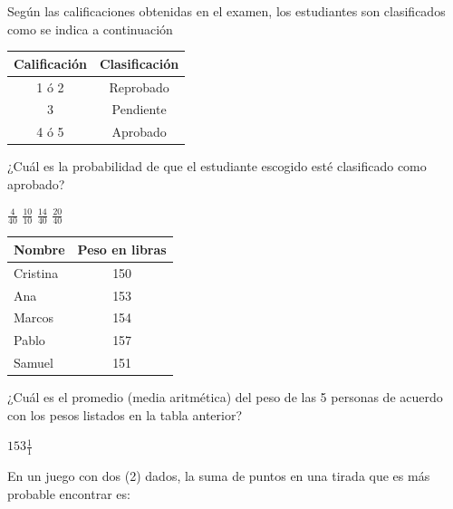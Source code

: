 \documentclass[10pt,letterpaper,addpoints]{exam}
\begin{document}
\begin{multicols}{2}
\begin{questions}
\question \label{quest02} Según las calificaciones obtenidas en el examen, los estudiantes son clasificados como se indica a continuación
\begin{center}
\begin{tabular}{|c|c|}
\hline 
\textbf{Calificación} & Clasificación \\ 
\hline 
1 ó 2 & Reprobado \\ 
\hline 
3 & Pendiente \\ 
\hline 
4 ó 5 & Aprobado \\ 
\hline 
\end{tabular} 
\end{center}
¿Cuál es la probabilidad de que el estudiante escogido esté clasificado como aprobado?

\begin{oneparchoices}
\choice $\frac{4}{40}$ \choice $\frac{10}{10}$
\CorrectChoice $\frac{14}{40}$ \choice $\frac{20}{40}$
\end{oneparchoices}
\begin{center}
\begin{tabular}{|l|c|}
\hline 
\textbf{Nombre} & Peso en libras \\ 
\hline 
Cristina & 150 \\ 
\hline 
Ana & 153 \\ 
\hline 
Marcos & 154 \\ 
\hline 
Pablo & 157 \\ 
\hline 
Samuel & 151 \\ 
\hline 
\end{tabular} 
\end{center}
\question ¿Cuál es el promedio (media aritmética) del peso de las 5 personas de acuerdo con los pesos listados en la tabla anterior?

\begin{oneparchoices}
\choice $153 \frac{1}{1}$
\end{oneparchoices}
\question En un juego con dos (2) dados, la suma de puntos en una tirada que es más probable encontrar es:


\end{questions}
\end{multicols}
\end{document}
